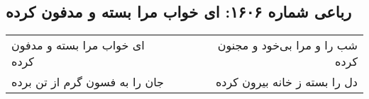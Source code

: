 \begin{center}
\section*{رباعی شماره ۱۶۰۶: ای خواب مرا بسته و مدفون کرده}
\label{sec:1606}
\begin{longtable}{l p{0.5cm} r}
ای خواب مرا بسته و مدفون کرده
&&
شب را و مرا بی‌خود و مجنون کرده
\\
جان را به فسون گرم از تن برده
&&
دل را بسته ز خانه بیرون کرده
\\
\end{longtable}
\end{center}
